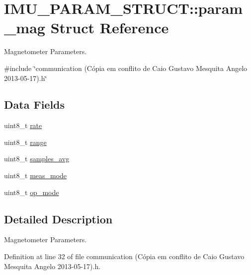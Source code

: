\hypertarget{structIMU__PARAM__STRUCT_1_1param__mag}{\section{I\-M\-U\-\_\-\-P\-A\-R\-A\-M\-\_\-\-S\-T\-R\-U\-C\-T\-:\-:param\-\_\-mag Struct Reference}
\label{structIMU__PARAM__STRUCT_1_1param__mag}
}


Magnetometer Parameters.  




{\ttfamily \#include \char`\"{}communication (\-Cópia em conflito de Caio Gustavo Mesquita Angelo 2013-\/05-\/17).\-h\char`\"{}}

\subsection*{Data Fields}
\begin{DoxyCompactItemize}
\item 
uint8\-\_\-t \hyperlink{structIMU__PARAM__STRUCT_1_1param__mag_a234de95423b604b05b851ef90890cea1}{rate}
\item 
uint8\-\_\-t \hyperlink{structIMU__PARAM__STRUCT_1_1param__mag_a40ad27ebdb5fde35257b1dc52e40f476}{range}
\item 
uint8\-\_\-t \hyperlink{structIMU__PARAM__STRUCT_1_1param__mag_a52c22cae6940eb39fb72aca66cfeba9a}{samples\-\_\-avg}
\item 
uint8\-\_\-t \hyperlink{structIMU__PARAM__STRUCT_1_1param__mag_a1f3536709c05310005d648f339d70c54}{meas\-\_\-mode}
\item 
uint8\-\_\-t \hyperlink{structIMU__PARAM__STRUCT_1_1param__mag_a39b83b3e9ff5bdcafed0bdf6a2de584b}{op\-\_\-mode}
\end{DoxyCompactItemize}


\subsection{Detailed Description}
Magnetometer Parameters. 

Definition at line 32 of file communication (\-Cópia em conflito de Caio Gustavo Mesquita Angelo 2013-\/05-\/17).\-h.



